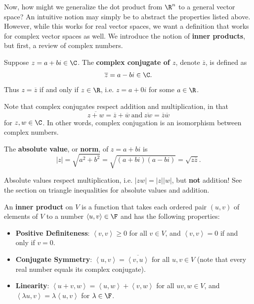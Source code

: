 \documentclass[math0540-lecture-notes.tex]{subfiles}
\begin{document}
Now, how might we generalize the dot product from $\R^n$ to a general vector space? An intuitive
notion may simply be to abstract the properties listed above. However, while this works for real
vector spaces, we want a definition that works for complex vector spaces as well. We introduce the
notion of \textbf{inner products}, but first, a review of complex numbers.

\begin{definition}{}
  Suppose $z=a+bi\in \C$. The \textbf{complex conjugate of $z$}, denote $\overline{z}$, is defined
  as \[
    \overline{z}=a-bi\in \C
  .\] Thus $z=\overline{z}$ if and only if $z\in \R$, i.e. $z=a+0i$ for some $a\in \R$.
\end{definition}

Note that complex conjugates respect addition and multiplication, in that \[
  \overline{z+w}=\overline{z}+\overline{w} ~\text{and}~ \overline{zw}=\overline{z}\overline{w}
\] for $z,w\in \C$. In other words, complex conjugation is an isomorphism between complex numbers.

\begin{definition}{}
  The \textbf{absolute value}, or \textbf{norm}, of $z=a+bi$ is \[
    \left| z \right| =\sqrt{a^2+b^2}=\sqrt{(a+bi)(a-bi)}=\sqrt{z\overline{z}}
  .\] 
\end{definition}
Absolute values respect multiplication, i.e. $\left| zw \right| =\left| z \right| \left| w \right|$,
but \textbf{not} addition! See the section on triangle inequalities for absolute values and
addition.




\begin{definition}{}
  An \textbf{inner product} on $V$ is a function that takes each ordered pair $(u,v)$ of elements of
  $V$ to a number $\left<u,v \right>\in \F$ and has the following properties:
  \begin{itemize}
    \item \textbf{Positive Definiteness}: $\left<v,v \right> \ge 0$ for all $v\in V$, and $\left<v,v
      \right>=0$ if and only if $v=0$.
    \item \textbf{Conjugate Symmetry}: $\left<u,v \right> = \overline{\left<v,u \right>}$ for all
      $u,v\in V$ (note that every real number equals its complex conjugate).
    \item \textbf{Linearity}: $\left<u+v,w \right> = \left<u,w \right>+\left<v,w \right>$ for all
      $uv,w\in V$, and $\left<\lambda u,v \right>=\lambda\left<u,v \right>$ for $\lambda\in \F$.
  \end{itemize}
\end{definition}
\end{document}
